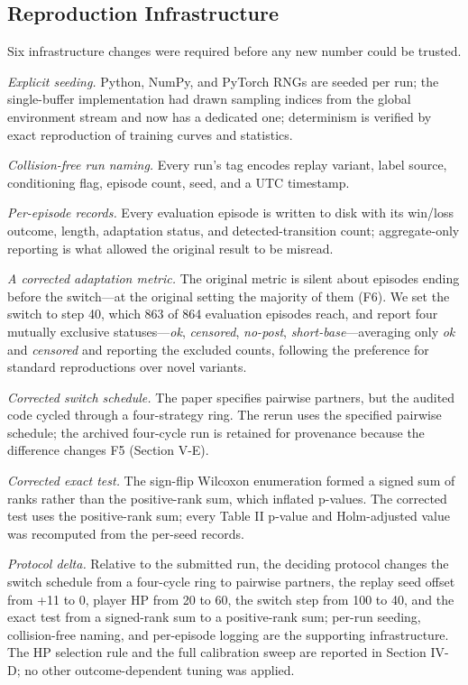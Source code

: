 \documentclass[conference,9pt]{IEEEtran}
\begin{document}
\subsection{Reproduction Infrastructure}

Six infrastructure changes were required before any new number could be trusted.

\textit{Explicit seeding.} Python, NumPy, and PyTorch RNGs are seeded per run; the single-buffer implementation had drawn sampling indices from the global environment stream and now has a dedicated one; determinism is verified by exact reproduction of training curves and statistics.

\textit{Collision-free run naming.} Every run's tag encodes replay variant, label source, conditioning flag, episode count, seed, and a UTC timestamp.

\textit{Per-episode records.} Every evaluation episode is written to disk with its win/loss outcome, length, adaptation status, and detected-transition count; aggregate-only reporting is what allowed the original result to be misread.

\textit{A corrected adaptation metric.} The original metric is silent about episodes ending before the switch---at the original setting the majority of them (F6). We set the switch to step 40, which 863 of 864 evaluation episodes reach, and report four mutually exclusive statuses---\textit{ok}, \textit{censored}, \textit{no-post}, \textit{short-base}---averaging only \textit{ok} and \textit{censored} and reporting the excluded counts, following the preference for standard reproductions over novel variants.

\textit{Corrected switch schedule.} The paper specifies pairwise partners, but the audited code cycled through a four-strategy ring. The rerun uses the specified pairwise schedule; the archived four-cycle run is retained for provenance because the difference changes F5 (Section V-E).

\textit{Corrected exact test.} The sign-flip Wilcoxon enumeration formed a signed sum of ranks rather than the positive-rank sum, which inflated p-values. The corrected test uses the positive-rank sum; every Table II p-value and Holm-adjusted value was recomputed from the per-seed records.

\textit{Protocol delta.} Relative to the submitted run, the deciding protocol changes the switch schedule from a four-cycle ring to pairwise partners, the replay seed offset from +11 to 0, player HP from 20 to 60, the switch step from 100 to 40, and the exact test from a signed-rank sum to a positive-rank sum; per-run seeding, collision-free naming, and per-episode logging are the supporting infrastructure. The HP selection rule and the full calibration sweep are reported in Section IV-D; no other outcome-dependent tuning was applied.
\end{document}
